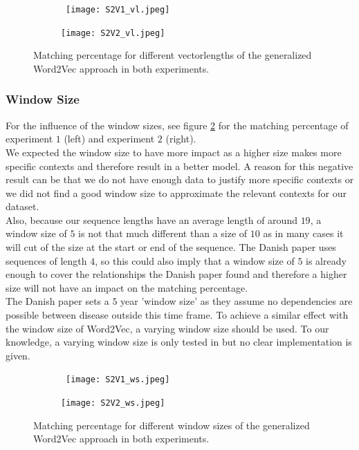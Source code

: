 \begin{figure}[!htb]
	\centering
	\begin{subfigure}[b]{.49\textwidth}\
		\texttt{[image: S2V1\_vl.jpeg]}
	\end{subfigure}
	\begin{subfigure}[b]{.49\textwidth}
		\texttt{[image: S2V2\_vl.jpeg]}
	\end{subfigure}
	\caption{Matching percentage for different vectorlengths of the generalized Word2Vec 		approach in both experiments.}
	\label{fig:s2v_vl}
\end{figure}

\subsubsection{Window Size}

For the influence of the window sizes, see figure \ref{fig:s2v_ws} for the matching percentage of experiment $1$ (left) and experiment $2$ (right). \\
We expected the window size to have more impact as a higher size makes more specific contexts and therefore result in a better model. A reason for this negative result can be that we do not have enough data to justify more specific contexts or we did not find a good window size to approximate the relevant contexts for our dataset. \\
Also, because our sequence lengths have an average length of around $19$, a window size of $5$ is not that much different than a size of $10$ as in many cases it will cut of the size at the start or end of the sequence. The Danish paper uses sequences of length $4$, so this could also imply that a window size of $5$ is already enough to cover the relationships the Danish paper found and therefore a higher size will not have an impact on the matching percentage. \\
The Danish paper sets a $5$ year 'window size' as they assume no dependencies are possible between disease outside this time frame. To achieve a similar effect with the window size of Word2Vec, a varying window size should be used. To our knowledge, a varying window size is only tested in \cite{w2vTuning:article} but no clear implementation is given. 

\begin{figure}[!htb]
	\centering
	\begin{subfigure}[b]{.49\textwidth}\
		\texttt{[image: S2V1\_ws.jpeg]}
	\end{subfigure}
	\begin{subfigure}[b]{.49\textwidth}
		\texttt{[image: S2V2\_ws.jpeg]}
	\end{subfigure}
	\caption{Matching percentage for different window sizes of the generalized Word2Vec 		approach in both experiments.}
	\label{fig:s2v_ws}
\end{figure}



